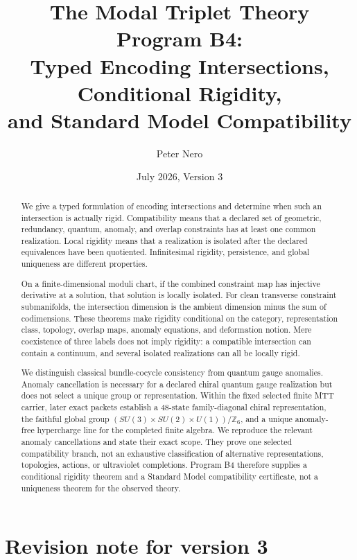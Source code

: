 \documentclass[11pt]{article}
\title{The Modal Triplet Theory Program B4:\\
Typed Encoding Intersections, Conditional Rigidity,\\
and Standard Model Compatibility}
\author{Peter Nero}
\date{July 2026, Version 3}
\begin{document}
\maketitle

\begin{abstract}
We give a typed formulation of encoding intersections and determine when such
an intersection is actually rigid.  Compatibility means that a declared set
of geometric, redundancy, quantum, anomaly, and overlap constraints has at
least one common realization.  Local rigidity means that a realization is
isolated after the declared equivalences have been quotiented.  Infinitesimal
rigidity, persistence, and global uniqueness are different properties.

On a finite-dimensional moduli chart, if the combined constraint map has
injective derivative at a solution, that solution is locally isolated.  For
clean transverse constraint submanifolds, the intersection dimension is the
ambient dimension minus the sum of codimensions.  These theorems make rigidity
conditional on the category, representation class, topology, overlap maps,
anomaly equations, and deformation notion.  Mere coexistence of three labels
does not imply rigidity: a compatible intersection can contain a continuum,
and several isolated realizations can all be locally rigid.

We distinguish classical bundle-cocycle consistency from quantum gauge
anomalies.  Anomaly cancellation is necessary for a declared chiral quantum
gauge realization but does not select a unique group or representation.
Within the fixed selected finite MTT carrier, later exact packets establish a
48-state family-diagonal chiral representation, the faithful global group
$(SU(3)\times SU(2)\times U(1))/\mathbb Z_6$, and a unique anomaly-free
hypercharge line for the completed finite algebra.  We reproduce the relevant
anomaly cancellations and state their exact scope.  They prove one selected
compatibility branch, not an exhaustive classification of alternative
representations, topologies, actions, or ultraviolet completions.  Program B4
therefore supplies a conditional rigidity theorem and a Standard Model
compatibility certificate, not a uniqueness theorem for the observed theory.
\end{abstract}

\section*{Revision note for version 3}
\end{document}

